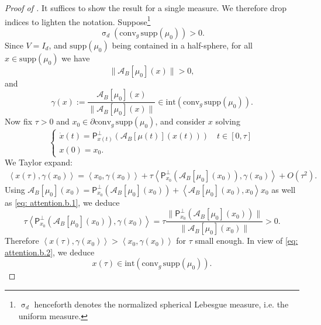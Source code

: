 \documentclass[a4paper,11pt]{article}
\theoremstyle{plain}
\newcommand{\supp}{\mathrm{supp}}
\newcommand{\proj}{\bm{\mathsf{P}}^\perp}
\newcommand{\conv}{\mathrm{conv}}
\newcommand{\bV}{\bm{\mathit{V}}}
\newcommand{\bB}{\bm{\mathit{B}}}
\numberwithin{equation}{section}
\begin{document}
\begin{proof}[Proof of ] 
It suffices to show the result for a single measure. We therefore drop indices to lighten the notation.
Suppose\footnote{$\upsigma_d$ henceforth denotes the normalized spherical Lebesgue measure, i.e. the uniform measure.}
\begin{equation*}
    \upsigma_d(\conv_g\,\supp(\mu_0))>0.
\end{equation*}
Since $\bV=I_d$, and $\supp(\mu_0)$ being contained in a half-sphere, for all 
$x\in \supp(\mu_0)$ we have
\begin{equation}\label{eq: attention.b.1}
    \|\mathscr{A}_{\bB}[\mu_0](x)\|>0,
\end{equation}
and
\begin{equation}\label{eq: attention.b.2}
    \gamma(x):=\frac{\mathscr{A}_{\bB}[\mu_0](x)}{\|\mathscr{A}_{\bB}[\mu_0](x)\|}\in \mathrm{int}\left(\conv_g\,\supp(\mu_0)\right).
\end{equation}
Now fix $\tau>0$ and $x_0\in\partial \conv_g\,\supp(\mu_0)$, and consider $x$ solving
\begin{equation}\label{eq: char.flow}
    \begin{cases}
        \dot{x}(t)=\proj_{x(t)}\left(\mathscr{A}_{\bB}[\mu(t)](x(t))\right)\quad t\in [0,\tau]\\
        x(0)=x_0.
    \end{cases}
\end{equation}
We Taylor expand: 
\begin{align*}
    \left\langle x(\tau), \gamma(x_0) \right\rangle = \left\langle x_0, \gamma(x_0) \right\rangle+ \tau\left\langle \proj_{x_0}(\mathscr{A}_{\bB}[\mu_0](x_0)), \gamma(x_0) \right\rangle+O(\tau^2).
\end{align*}
Using $\mathscr{A}_{\bB}[\mu_0](x_0)=\proj_{x_0}(\mathscr{A}_{\bB}[\mu_0](x_0))+ \left\langle \mathscr{A}_{\bB}[\mu_0](x_0),x_0 \right\rangle x_0 $ as well as \eqref{eq: attention.b.1}, we deduce
\begin{equation*}
   \tau\left\langle \proj_{x_0}(\mathscr{A}_{\bB}[\mu_0](x_0)), \gamma(x_0)\right\rangle=\tau  \frac{\|\proj_{x_0}(\mathscr{A}_{\bB}[\mu_0](x_0))\|}{\|\mathscr{A}_{\bB}[\mu_0](x_0)\|} >0.
\end{equation*}
Therefore $\left\langle x(\tau), \gamma(x_0) \right\rangle> \left\langle x_0, \gamma(x_0) \right\rangle$ for $\tau$ small enough. In view of \eqref{eq: attention.b.2}, we deduce
\begin{equation*}
    x(\tau)\in \mathrm{int}(\conv_g\,\supp(\mu_0)).

\end{equation*}
\end{proof}
\end{document}
